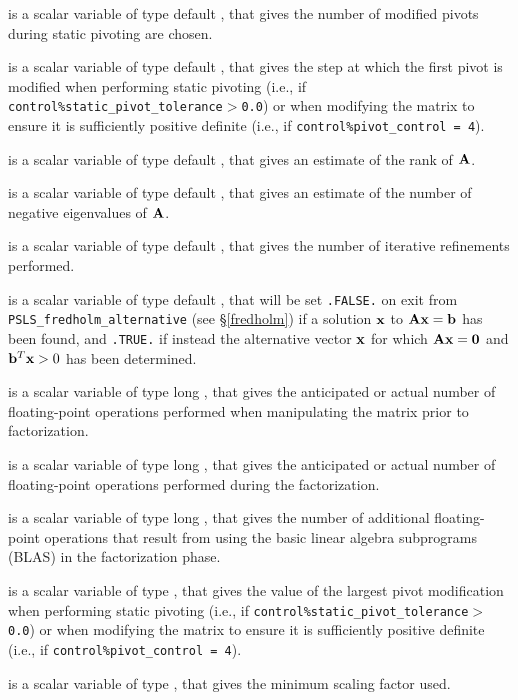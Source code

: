 \documentclass{galahad}
\newcommand{\packagename}{PSLS}
\begin{document}
\begin{description}
 is a scalar variable of type default \integer,
that gives the number of modified pivots during static pivoting are chosen.

 is a scalar variable of type default \integer,
that gives the step at which the first pivot is modified when performing
static pivoting (i.e., if {\tt control\%static\_pivot\_tolerance$>$0.0})
or when modifying the matrix to ensure it is sufficiently positive definite
(i.e., if {\tt control\%pivot\_control = 4}).

 is a scalar variable of type default \integer,
that gives an estimate of the rank of ${\mathbf{A}}$.

 is a scalar variable of type default \integer,
that gives an estimate of the number of negative eigenvalues of ${\mathbf{A}}$.

 is a scalar variable of type default \integer,
that gives the number of iterative refinements performed.

 is a scalar variable of type default \logical,
that will be set {\tt .FALSE.} on exit from
{\tt \packagename\_fredholm\_\-alternative} (see \S\ref{fredholm})
if a solution ${\mathbf{x}}$ to ${\mathbf{A}} {\mathbf{x}} = {\mathbf{b}}$ has been found,
and {\tt .TRUE.} if instead the alternative vector ${\mathbf{x}}$ for which
${\mathbf{A}} {\mathbf{x}} = {\mathbf{0}}$ and ${\mathbf{b}}^T {\mathbf{x}} > 0$ has been determined.

 is a scalar variable of type long \integer,
that gives the anticipated or actual number of floating-point operations
performed when manipulating the matrix prior to factorization.

 is a scalar variable of type long \integer,
that gives the anticipated or actual number of floating-point operations
performed during the factorization.

 is a scalar variable of type long \integer,
that gives the number of additional floating-point operations
that result from using the basic linear algebra subprograms (BLAS)
in the factorization phase.

 is a scalar variable of type \realdp,
that gives the value of the largest pivot modification when performing
static pivoting (i.e., if {\tt control\%static\_pivot\_\-tolerance$>$0.0})
or when modifying the matrix to ensure it is sufficiently positive definite
(i.e., if {\tt control\-\%pivot\_control = 4}).

 is a scalar variable of type \realdp,
that gives the minimum scaling factor used.


\end{description}
\end{document}
